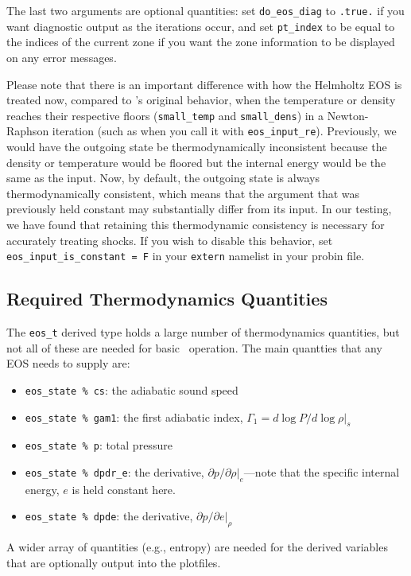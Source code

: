 The last two arguments are optional quantities: set \texttt{do\_eos\_diag} to \texttt{.true.} if you want diagnostic output as the iterations occur, and set \texttt{pt\_index} to be equal to the indices of the current zone if you want the zone information to be displayed on any error messages.

Please note that there is an important difference with how the
Helmholtz EOS is treated now, compared to \castro's original behavior,
when the temperature or density reaches their respective floors
({\tt small\_temp} and {\tt small\_dens}) in a Newton-Raphson
iteration (such as when you call it with
{\tt eos\_input\_re}). Previously, we would have the outgoing state
be thermodynamically inconsistent because the density or temperature
would be floored but the internal energy would be the same as the
input. Now, by default, the outgoing state is always thermodynamically
consistent, which means that the argument that was previously held
constant may substantially differ from its input. In our testing, we
have found that retaining this thermodynamic consistency is necessary
for accurately treating shocks. If you wish to disable this behavior,
set \texttt{eos\_input\_is\_constant = F} in your \texttt{extern}
namelist in your probin file.

\subsection{Required Thermodynamics Quantities}

The {\tt eos\_t} derived type holds a large number of thermodynamics
quantities, but not all of these are needed for basic
\castro\ operation.  The main quantties that any EOS needs to
supply are:
\begin{itemize}
  \item {\tt eos\_state \% cs}: the adiabatic sound speed
  \item {\tt eos\_state \% gam1}: the first adiabatic index, 
       $\Gamma_1 = d\log P / d\log \rho |_s$
  \item {\tt eos\_state \% p}: total pressure
  \item {\tt eos\_state \% dpdr\_e}: the derivative, $\partial
    p/\partial \rho |_e$---note that the specific internal energy, $e$
    is held constant here.
  \item {\tt eos\_state \% dpde}: the derivative, $\partial p /
    \partial e |_\rho$
\end{itemize}

A wider array of quantities (e.g., entropy) are needed for the derived
variables that are optionally output into the plotfiles.

